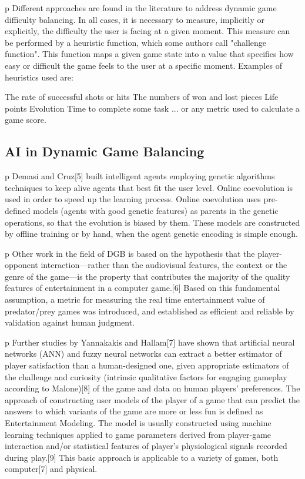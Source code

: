 p Different approaches are found in the literature to address dynamic game difficulty balancing. In all cases, it is necessary to measure, implicitly or explicitly, the difficulty the user is facing at a given moment. This measure can be performed by a heuristic function, which some authors call "challenge function". This function maps a given game state into a value that specifies how easy or difficult the game feels to the user at a specific moment. Examples of heuristics used are:

The rate of successful shots or hits
The numbers of won and lost pieces
Life points
Evolution
Time to complete some task
... or any metric used to calculate a game score.

\subsection{AI in Dynamic Game Balancing}
p Demasi and Cruz[5] built intelligent agents employing genetic algorithms techniques to keep alive agents that best fit the user level. Online coevolution is used in order to speed up the learning process. Online coevolution uses pre-defined models (agents with good genetic features) as parents in the genetic operations, so that the evolution is biased by them. These models are constructed by offline training or by hand, when the agent genetic encoding is simple enough.

p Other work in the field of DGB is based on the hypothesis that the player-opponent interaction—rather than the audiovisual features, the context or the genre of the game—is the property that contributes the majority of the quality features of entertainment in a computer game.[6] Based on this fundamental assumption, a metric for measuring the real time entertainment value of predator/prey games was introduced, and established as efficient and reliable by validation against human judgment.

p Further studies by Yannakakis and Hallam[7] have shown that artificial neural networks (ANN) and fuzzy neural networks can extract a better estimator of player satisfaction than a human-designed one, given appropriate estimators of the challenge and curiosity (intrinsic qualitative factors for engaging gameplay according to Malone)[8] of the game and data on human players' preferences. The approach of constructing user models of the player of a game that can predict the answers to which variants of the game are more or less fun is defined as Entertainment Modeling. The model is usually constructed using machine learning techniques applied to game parameters derived from player-game interaction and/or statistical features of player's physiological signals recorded during play.[9] This basic approach is applicable to a variety of games, both computer[7] and physical.

